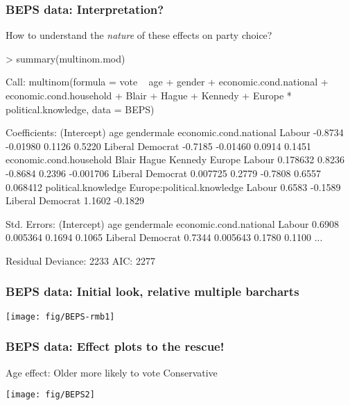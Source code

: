 \begin{frame}[fragile]
 \frametitle{BEPS data: Interpretation?}
How to understand the \emph{nature} of these effects on party choice?
\begin{Rin}
> summary(multinom.mod)
\end{Rin}
\begin{Rout}[baselinestretch=0.8, fontsize=\footnotesize]
Call:
multinom(formula = vote ~ age + gender + economic.cond.national + 
    economic.cond.household + Blair + Hague + Kennedy + Europe * 
    political.knowledge, data = BEPS)

Coefficients:
                 (Intercept)      age gendermale economic.cond.national
Labour               -0.8734 -0.01980     0.1126                 0.5220
Liberal Democrat     -0.7185 -0.01460     0.0914                 0.1451
                 economic.cond.household  Blair   Hague Kennedy    Europe
Labour                          0.178632 0.8236 -0.8684  0.2396 -0.001706
Liberal Democrat                0.007725 0.2779 -0.7808  0.6557  0.068412
                 political.knowledge Europe:political.knowledge
Labour                        0.6583                    -0.1589
Liberal Democrat              1.1602                    -0.1829

Std. Errors:
                 (Intercept)      age gendermale economic.cond.national
Labour                0.6908 0.005364     0.1694                 0.1065
Liberal Democrat      0.7344 0.005643     0.1780                 0.1100
...

Residual Deviance: 2233 
AIC: 2277 
\end{Rout}
	
\end{frame}


\begin{frame}
 \frametitle{BEPS data: Initial look, relative multiple barcharts}
 \begin{center}
 	 \texttt{[image: fig/BEPS-rmb1]}
 \end{center}
\end{frame}

\begin{frame}
 \frametitle{BEPS data: Effect plots to the rescue!}
 Age effect: Older more likely to vote Conservative
% 

 \begin{center}
 	 \texttt{[image: fig/BEPS2]}
 \end{center}
\end{frame}

